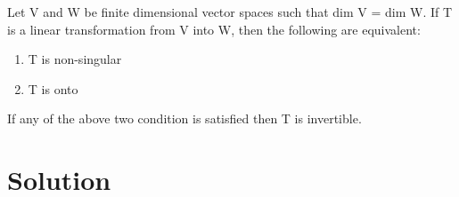 \documentclass[journal,12pt,twocolumn]{IEEEtran}
\begin{document}
	\begin{theorem}\label{thm2}
		Let V and W be finite dimensional vector spaces such that  dim V = dim W. If T is a linear transformation from V into W, then the following are equivalent:
		\begin{enumerate}
			\item T is non-singular
			\item T is onto
		\end{enumerate}
		If any of the above two condition is satisfied then T is invertible.
	\end{theorem}
	
	
	
	\section{Solution}
	
\end{document}
